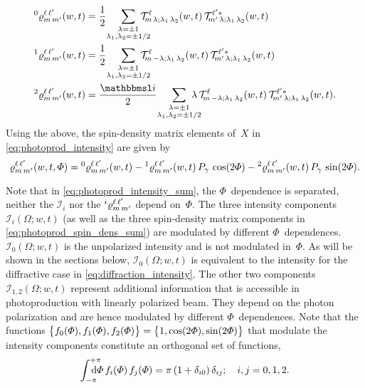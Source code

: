 \begin{align}
  \label{eq:photoprod_rho_0}
  \prescript{0}{}{\varrho}^{\ell\, \ell'}_{m\, m'}(w, t)
  ={}& \frac{1}{2}\quad \sum_{\substack{\lambda = \pm 1 \\ \mathclap{\lambda_1, \lambda_2 = \pm 1/2}}}
  \mathcal{T}^\ell_{\!m\, \lambda; \lambda_1\, \lambda_2}(w, t)\,
  \mathcal{T}^{\ell' *}_{\!m'\, \lambda; \lambda_1\, \lambda_2}(w, t)
  \\
  \label{eq:photoprod_rho_1}
  \prescript{1}{}{\varrho}^{\ell\, \ell'}_{m\, m'}(w, t)
  ={}& \frac{1}{2}\quad \sum_{\substack{\lambda = \pm 1 \\ \mathclap{\lambda_1, \lambda_2 = \pm 1/2}}}
  \mathcal{T}^\ell_{\!m\, {-\lambda}; \lambda_1\, \lambda_2}(w, t)\,
  \mathcal{T}^{\ell' *}_{\!m'\, \lambda; \lambda_1\, \lambda_2}(w, t)
  \\
  \label{eq:photoprod_rho_2}
  \prescript{2}{}{\varrho}^{\ell\, \ell'}_{m\, m'}(w, t)
  ={}& \frac{\imag}{2}\quad \sum_{\substack{\lambda = \pm 1 \\ \mathclap{\lambda_1, \lambda_2 = \pm 1/2}}}
  \lambda\,
  \mathcal{T}^\ell_{\!m\, {-\lambda}; \lambda_1\, \lambda_2}(w, t)\,
  \mathcal{T}^{\ell' *}_{\!m'\, \lambda; \lambda_1\, \lambda_2}(w, t).
\end{align}
Using the above, the spin-density matrix elements of~$X$ in
\cref{eq:photoprod_intensity} are given by
\begin{equation}
  \label{eq:photoprod_spin_dens_sum}
  \varrho^{\ell\, \ell'}_{m\, m'}(w, t, \Phi)
  = \prescript{0}{}{\varrho}^{\ell\, \ell'}_{m\, m'}(w, t)
  - \prescript{1}{}{\varrho}^{\ell\, \ell'}_{m\, m'}(w, t)\, P_\gamma\, \cos(2 \Phi)
  - \prescript{2}{}{\varrho}^{\ell\, \ell'}_{m\, m'}(w, t)\, P_\gamma\, \sin(2 \Phi).
\end{equation}

Note that in \cref{eq:photoprod_intensity_sum}, the $\Phi$~dependence
is separated, \ie neither the $\mathcal{I}_i$ nor the
$\prescript{i}{}{\varrho}^{\ell\, \ell'}_{m\, m'}$ depend on~$\Phi$.
The three intensity components $\mathcal{I}_i(\Omega; w, t)$ (as well
as the three spin-density matrix components in
\cref{eq:photoprod_spin_dens_sum}) are modulated by different
$\Phi$~dependences.  $\mathcal{I}_0(\Omega; w, t)$ is the unpolarized
intensity and is not modulated in~$\Phi$.  As will be shown in the
sections below, $\mathcal{I}_0(\Omega; w, t)$ is equivalent to the
intensity for the diffractive case in \cref{eq:diffraction_intensity}.
The other two components $\mathcal{I}_{1, 2}(\Omega; w, t)$ represent
additional information that is accessible in photoproduction with
linearly polarized beam.  They depend on the photon polarization and
are hence modulated by different $\Phi$~dependences.  Note that the
functions $\cBrk[1]{f_0(\Phi), f_1(\Phi), f_2(\Phi)} = \cBrk[1]{1,
\cos(2 \Phi), \sin(2 \Phi)}$ that modulate the intensity components
constitute an orthogonal set of functions, \ie
\begin{equation}
  \label{eq:photoprod_orthogonality_phi}
  \int_{-\pi}^{+\pi}\hspace{-1.2em} \dif{\Phi}\, f_i(\Phi)\, f_j(\Phi)
  = \pi\, (1 + \delta_{i 0})\, \delta_{i j};
  \quad i, j = 0 ,1, 2. 
\end{equation}

